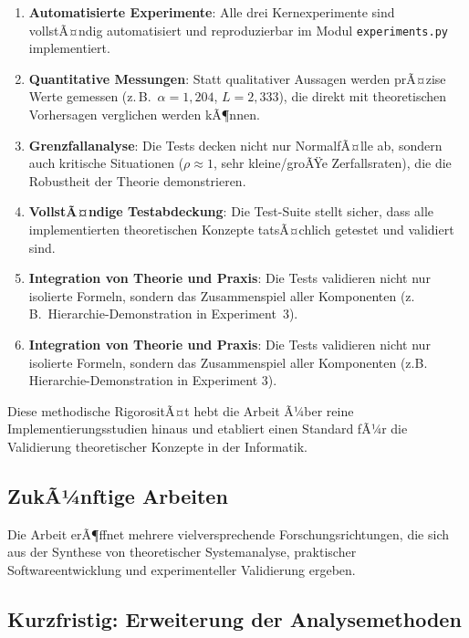 ﻿\documentclass[a4paper,12pt]{report}
\theoremstyle{definition}
\begin{document}
\begin{enumerate}
	\item[-] \textbf{Automatisierte Experimente}: Alle drei Kernexperimente
	sind vollstÃ¤ndig automatisiert und reproduzierbar im Modul
	\texttt{experiments.py} implementiert.
	
	\item[-] \textbf{Quantitative Messungen}: Statt qualitativer Aussagen
	werden prÃ¤zise Werte gemessen (z.\,B.\ $\alpha = 1{,}204$,
	$L = 2{,}333$), die direkt mit theoretischen Vorhersagen verglichen
	werden kÃ¶nnen.
	
	\item[-] \textbf{Grenzfallanalyse}: Die Tests decken nicht nur
	NormalfÃ¤lle ab, sondern auch kritische Situationen ($\rho \approx 1$,
	sehr kleine/groÃŸe Zerfallsraten), die die Robustheit der Theorie
	demonstrieren.
	
	\item[-] \textbf{VollstÃ¤ndige Testabdeckung}: Die Test-Suite stellt
	sicher, dass alle implementierten theoretischen Konzepte tatsÃ¤chlich
	getestet und validiert sind.
	
	\item[-] \textbf{Integration von Theorie und Praxis}: Die Tests
	validieren nicht nur isolierte Formeln, sondern das Zusammenspiel
	aller Komponenten (z.\,B.\ Hierarchie-Demonstration in Experiment~3).
	
	\item[-] \textbf{Integration von Theorie und Praxis}: Die Tests validieren nicht nur isolierte Formeln, sondern das Zusammenspiel aller Komponenten (z.B. Hierarchie-Demonstration in Experiment 3).
\end{enumerate}

Diese methodische RigorositÃ¤t hebt die Arbeit Ã¼ber reine Implementierungsstudien hinaus und etabliert einen Standard fÃ¼r die Validierung theoretischer Konzepte in der Informatik.

\subsection{ZukÃ¼nftige Arbeiten}

Die Arbeit erÃ¶ffnet mehrere vielversprechende Forschungsrichtungen, die sich aus der Synthese von theoretischer Systemanalyse, praktischer Softwareentwicklung und experimenteller Validierung ergeben.

\subsection{Kurzfristig: Erweiterung der Analysemethoden}
\end{document}
